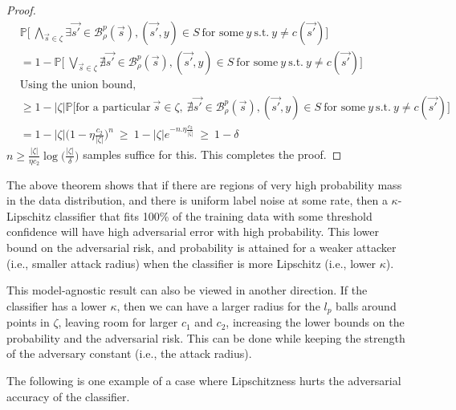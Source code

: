 \documentclass{ociamthesis}
\begin{document}
\begin{proof}
\begin{equation*}
    \label{eq:Lipschitz-extension}
\begin{split}
    & \mathbb{P} \biggl [~\underset{\vec{s} \in \zeta}{\bigwedge} \exists 
    \vec{s'} \in \mathcal{B}_\rho^p(\vec{s}), 
    (\vec{s'}, y) \in S~\text{for some}~ y~\text{s.t.}~y \neq c(\vec{s'})
    \biggr] \\
    & = 1 - \mathbb{P} \biggl [~\underset{\vec{s} \in \zeta}{\bigvee} \nexists 
    \vec{s'} \in \mathcal{B}_\rho^p(\vec{s}), 
    (\vec{s'}, y) \in S~\text{for some}~ y~\text{s.t.}~y \neq c(\vec{s'})
    \biggr] \\
    & \text{Using the union bound,} \\
    & \geq 1 - |\zeta| \mathbb{P} \biggl [\text{for a particular}~\vec{s} \in \zeta,
    ~\nexists \vec{s'} \in \mathcal{B}_\rho^p(\vec{s}), 
    (\vec{s'}, y) \in S~\text{for some}~ y~\text{s.t.}~y \neq c(\vec{s'})
    \biggr] \\
    & = 1 - |\zeta| \biggl(1 - \eta \frac{c_2}{|\zeta|}\biggr)^{n}~
    \geq ~ 1 - |\zeta| e^{-n.\eta \frac{c_2}{|\zeta|}} ~ \geq ~ 1 - \delta
\end{split}
\end{equation*}
$n \geq \frac{|\zeta|}{\eta c_2} \log \bigl(\frac{|\zeta|}{\delta} \bigr)$
samples suffice for this. This completes the proof.
\end{proof}

The above theorem shows that if there are regions of very high probability mass
in the data distribution, and there is uniform label noise at some rate, then a
$\kappa$-Lipschitz classifier that fits 100\% of the training data with some
threshold confidence will have high adversarial error with high probability.
This lower bound on the adversarial risk, and probability is attained for a
weaker attacker (i.e., smaller attack radius) when the classifier is more
Lipschitz (i.e., lower $\kappa$). 

This model-agnostic result can also be viewed in another direction. If the
classifier has a lower $\kappa$, then we can have a larger radius for the $l_p$
balls around points in $\zeta$, leaving room for larger $c_1$ and $c_2$,
increasing the lower bounds on the probability and the adversarial risk. This
can be done while keeping the strength of the adversary constant (i.e., the
attack radius).

The following is one example of a case where Lipschitzness hurts the adversarial
accuracy of the classifier.
\end{document}

